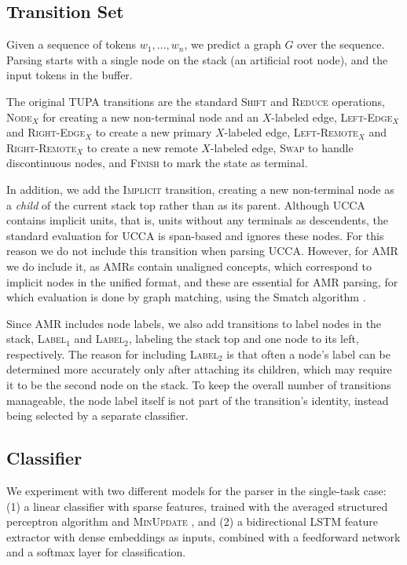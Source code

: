 \documentclass[11pt,a4paper]{article}
\begin{document}
\subsection{Transition Set}\label{sec:transition_set}
Given a sequence of tokens $w_1, \ldots, w_n$, we predict a graph $G$ over the sequence.
Parsing starts with a single node on the stack (an artificial root node), and the input tokens
in the buffer.

The original TUPA transitions \cite{hershcovich2017a} are
the standard \textsc{Shift} and \textsc{Reduce} operations,
\textsc{Node$_X$} for creating a new non-terminal node and an $X$-labeled edge,
\textsc{Left-Edge$_X$} and \textsc{Right-Edge$_X$} to create a new primary $X$-labeled edge,
\textsc{Left-Remote$_X$} and \textsc{Right-Remote$_X$} to create a new remote $X$-labeled edge,
\textsc{Swap} to handle discontinuous nodes,
and \textsc{Finish} to mark the state as terminal.

In addition, we add the \textsc{Implicit} transition, creating a new non-terminal
node as a \textit{child} of the current stack top rather than as its parent.
Although UCCA contains implicit units, that is, units without
any terminals as descendents,
the standard evaluation for UCCA \cite{abend2013universal} is span-based and
ignores these nodes.
For this reason we do not include this transition when parsing UCCA.
However, for AMR we do include it, as AMRs contain unaligned concepts,
which correspond to implicit nodes in the unified format,
and these are essential for AMR parsing, for which evaluation is done
by graph matching, using the Smatch algorithm \cite{cai2013smatch}.

Since AMR includes node labels, we also add transitions to
label nodes in the stack, \textsc{Label$_1$} and \textsc{Label$_2$},
labeling the stack top and one node to its left, respectively.
The reason for including \textsc{Label$_2$} is that often a node's
label can be determined more accurately only after attaching its children,
which may require it to be the second node on the stack.
To keep the overall number of transitions manageable,
the node label itself is not part of the transition's identity,
instead being selected by a separate classifier.

\subsection{Classifier}\label{sec:classifier}
We experiment with two different models for the parser in the single-task case:
(1) a linear classifier with sparse features, trained with the averaged structured perceptron algorithm
\cite{Coll:04} and \textsc{MinUpdate} \cite{goldberg2011learning},
and (2) a bidirectional LSTM feature extractor with dense embeddings as inputs,
combined with a feedforward network and a softmax layer for classification.
\end{document}
